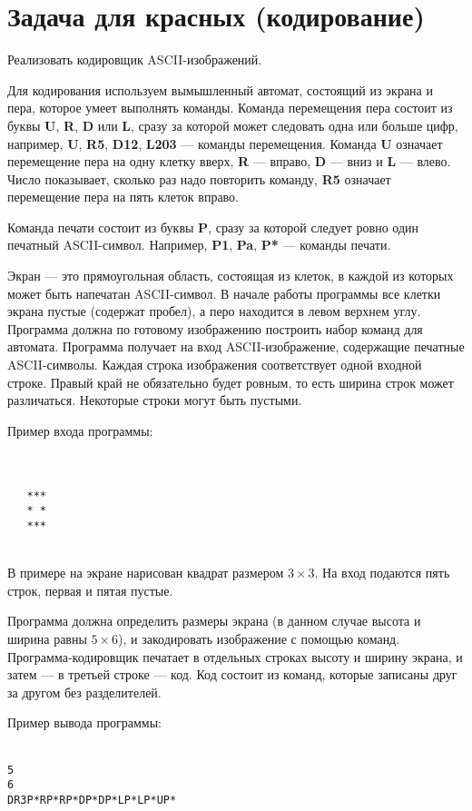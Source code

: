 \documentclass[a4paper,10pt]{article}
\begin{document}
\section*{Задача для красных (кодирование)}

Реализовать кодировщик ASCII-изображений.

Для кодирования используем вымышленный автомат, состоящий из экрана и пера, которое умеет выполнять команды. Команда перемещения пера состоит из буквы \textbf{U}, \textbf{R}, \textbf{D} или \textbf{L}, сразу за которой может следовать одна или больше цифр, например, \textbf{U}, \textbf{R5}, \textbf{D12}, \textbf{L203} — команды перемещения. Команда \textbf{U} означает перемещение пера на одну клетку вверх, \textbf{R} — вправо, \textbf{D} — вниз и \textbf{L} — влево. Число показывает, сколько раз надо повторить команду, \textbf{R5} означает перемещение пера на пять клеток вправо.

Команда печати состоит из буквы \textbf{P}, сразу за которой следует ровно один печатный ASCII-символ. Например, \textbf{P1}, \textbf{Pa}, \textbf{P*} — команды печати.

Экран — это прямоугольная область, состоящая из клеток, в каждой из которых может быть напечатан ASCII-символ. В начале работы программы все клетки экрана пустые (содержат пробел), а перо находится в левом верхнем углу. Программа должна по готовому изображению построить набор команд для автомата. Программа получает на вход ASCII-изображение, содержащие печатные ASCII-символы. Каждая строка изображения соответствует одной входной строке. Правый край не обязательно будет ровным, то есть ширина строк может различаться. Некоторые строки могут быть пустыми.

Пример входа программы:

\texttt{ \\
\\
\ \ \ ***\\
\ \ \ *\ *\\
\ \ \ ***\\
\\
}

В примере на экране нарисован квадрат размером $3\times 3$. На вход подаются пять строк, первая и пятая пустые.

Программа должна определить размеры экрана (в данном случае высота и ширина равны $5\times 6$), и закодировать изображение с помощью команд. Программа-кодировщик печатает в отдельных строках высоту и ширину экрана, и затем — в третьей строке — код. Код состоит из команд, которые записаны друг за другом без разделителей.

Пример вывода программы:

\texttt{ \\
5\\
6\\
DR3P*RP*RP*DP*DP*LP*LP*UP*}
\end{document}
